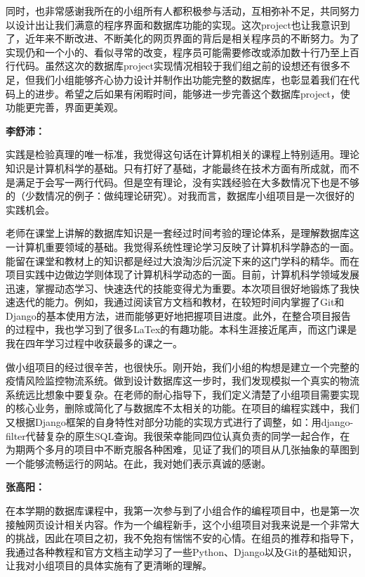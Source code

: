 \documentclass[12pt]{article}
\begin{document}
同时，也非常感谢我所在的小组所有人都积极参与活动，互相弥补不足，共同努力以设计出让我们满意的程序界面和数据库功能的实现。这次project也让我意识到了，近年来不断改进、不断美化的网页界面的背后是相关程序员的不断努力。为了实现仍和一个小的、看似寻常的改变，程序员可能需要修改或添加数十行乃至上百行代码。虽然这次的数据库project实现情况相较于我们组之前的设想还有很多不足，但我们小组能够齐心协力设计并制作出功能完整的数据库，也彰显着我们在代码上的进步。希望之后如果有闲暇时间，能够进一步完善这个数据库project，使功能更完善，界面更美观。

\vspace{0.3cm}
\noindent\textbf{李舒沛：}\par
实践是检验真理的唯一标准，我觉得这句话在计算机相关的课程上特别适用。理论知识是计算机科学的基础。只有打好了基础，才能最终在技术方面有所成就，而不是满足于会写一两行代码。但是空有理论，没有实践经验在大多数情况下也是不够的（少数情况的例子：做纯理论研究）。对我而言，数据库小组项目是一次很好的实践机会。

老师在课堂上讲解的数据库知识是一套经过时间考验的理论体系，是理解数据库这一计算机重要领域的基础。我觉得系统性理论学习反映了计算机科学静态的一面。能留在课堂和教材上的知识都是经过大浪淘沙后沉淀下来的这门学科的精华。而在项目实践中边做边学则体现了计算机科学动态的一面。目前，计算机科学领域发展迅速，掌握动态学习、快速迭代的技能变得尤为重要。本次项目很好地锻炼了我快速迭代的能力。例如，我通过阅读官方文档和教材，在较短时间内掌握了Git和Django的基本使用方法，进而能够更好地把握项目进度。此外，在整合项目报告的过程中，我也学习到了很多LaTex的有趣功能。本科生涯接近尾声，而这门课是我在四年学习过程中收获最多的课之一。

做小组项目的经过很辛苦，也很快乐。刚开始，我们小组的构想是建立一个完整的疫情风险监控物流系统。做到设计数据库这一步时，我们发现模拟一个真实的物流系统远比想象中要复杂。在老师的耐心指导下，我们定义清楚了小组项目需要实现的核心业务，删除或简化了与数据库不太相关的功能。在项目的编程实践中，我们又根据Django框架的自身特性对部分功能的实现方式进行了调整，如：用django-filter代替复杂的原生SQL查询。我很荣幸能同四位认真负责的同学一起合作，在为期两个多月的项目中不断克服各种困难，见证了我们的项目从几张抽象的草图到一个能够流畅运行的网站。在此，我对她们表示真诚的感谢。

\vspace{0.3cm}
\noindent\textbf{张高阳：}\par
在本学期的数据库课程中，我第一次参与到了小组合作的编程项目中，也是第一次接触网页设计相关内容。作为一个编程新手，这个小组项目对我来说是一个非常大的挑战，因此在项目之初，我不免抱有惴惴不安的心情。在组员的推荐和指导下，我通过各种教程和官方文档主动学习了一些Python、Django以及Git的基础知识，让我对小组项目的具体实施有了更清晰的理解。
\end{document}
